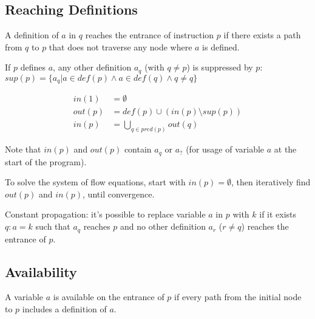 \subsection{Reaching Definitions}

A definition of $a$ in $q$ reaches the entrance of instruction $p$ if there exists a path from $q$ to $p$ that does not traverse any node where $a$ is defined.

If $p$ defines $a$, any other definition $a_q$ (with $q\ne p$) is suppressed by $p$: $sup(p) = \{a_q | a \in def(p) \land a \in def(q) \land q \ne q\}$

\begin{align*}
    in(1) &= \emptyset \\
    out(p) &= def(p) \cup (in(p) \setminus sup(p)) \\
    in(p) &= \bigcup_{q\in pred(p)} out(q)
\end{align*}

Note that $in(p)$ and $out(p)$ contain $a_q$ or $a_?$ (for usage of variable $a$ at the start of the program).

To solve the system of flow equations, start with $in(p) = \emptyset$, then iteratively find $out(p)$ and $in(p)$, until convergence.

Constant propagation: it's possible to replace variable $a$ in $p$ with $k$ if it exists $q: a = k$ such that $a_q$ reaches $p$ and no other definition $a_r$ ($r\ne q$) reaches the entrance of $p$.

\subsection{Availability}

A variable $a$ is available on the entrance of $p$ if every path from the initial node to $p$ includes a definition of $a$.
